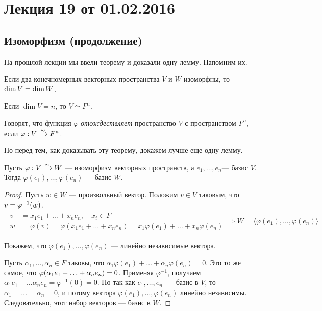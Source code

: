 


\renewcommand{\phi}{\varphi}

\section{Лекция 19 от 01.02.2016}

\subsection{Изоморфизм (продолжение)}
На прошлой лекции мы ввели теорему и доказали одну лемму. Напомним их.

\begin{Theorem}
Если два конечномерных векторных пространства $V$ и $W$ изоморфны, то $\dim V \hm= \dim W$.
\end{Theorem}

\begin{Lemma}[1]
Если $\dim V = n$, то $V \simeq F^n$.
\end{Lemma}

\begin{Comment}
Говорят, что функция $\phi$ \textit{отождествляет} пространство $V$ с пространством $F^n$, если $\phi: V \isom F^n$.
\end{Comment}

Но перед тем, как доказывать эту теорему, докажем лучше еще одну лемму.
\begin{Lemma}[2]
Пусть $\phi: V \isom W$ --- изоморфизм векторных пространств, а $e_1, \ldots, e_n$--- базис $V$. Тогда $\phi(e_1), \ldots, \phi(e_n)$ --- базис $W$.
\end{Lemma}

\begin{proof}
Пусть $w \in W$ --- произвольный вектор. Положим $v \in V$ таковым, что $v \hm= \phi^{-1}(w)$.
\begin{gather*}
\begin{aligned}
v &= x_1e_1 + \ldots + x_ne_n, \quad x_i \in F \\
w &= \phi(v) = \phi(x_1e_1 + \ldots + x_ne_n) = x_1\phi(e_1) + \ldots + x_n\phi(e_n)
\end{aligned} \Rightarrow W = \langle \phi(e_1), \ldots, \phi(e_n)\rangle
\end{gather*}

Покажем, что $\phi(e_1), \ldots, \phi(e_n)$ --- линейно независимые вектора.

Пусть $\alpha_1, \ldots, \alpha_n \in F$ таковы, что $\alpha_1\phi(e_1) + \ldots + \alpha_n\phi(e_n) = 0$. Это то же самое, что $\phi(\alpha_1 e_1 \hm+ \ldots + \alpha_n e_n) = 0$. Применяя $\phi^{-1}$, получаем $\alpha_1 e_1 + \ldots \alpha_n e_n = \phi^{-1}(0) = 0$. Но так как $e_1, \ldots, e_n$~--- базис в $V$, то $\alpha_1 = \ldots= \alpha_n = 0$, и потому вектора $\phi(e_1), \ldots, \phi(e_n)$ линейно независимы. Следовательно, этот набор векторов --- базис в $W$.
\end{proof}

